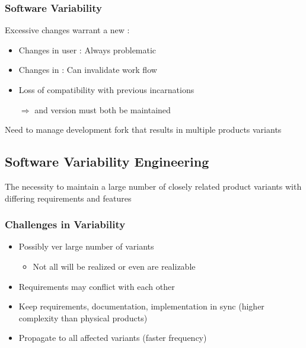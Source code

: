 \documentclass[
    ../../Software_Engineering_Summary.tex,
]
{subfiles}
\begin{document}
\subsubsection{Software Variability}
Excessive changes warrant a new :
\begin{itemize}
    \item Changes in user : Always problematic
    \item Changes in : Can invalidate work flow
    \item Loss of compatibility with previous incarnations
    \item[$\Rightarrow$]  and  version must both be maintained
\end{itemize}

Need to manage development fork that results in multiple products variants

\subsection{Software Variability Engineering}
\begin{defbox}
    The necessity to maintain a large number of closely related product variants with differing requirements and features
\end{defbox}

\subsubsection{Challenges in Variability}
\begin{defbox}
    \begin{itemize}
        \item Possibly ver large number of variants
        \begin{itemize}
            \item Not all will be realized or even are realizable
        \end{itemize}
        \item Requirements may conflict with each other
    \end{itemize}
\end{defbox}

\begin{defbox}
    \begin{itemize}
        \item Keep requirements, documentation, implementation in sync  (higher complexity than physical products)
        \item Propagate  to all affected variants (faster frequency)
    \end{itemize}
\end{defbox}
\end{document}
